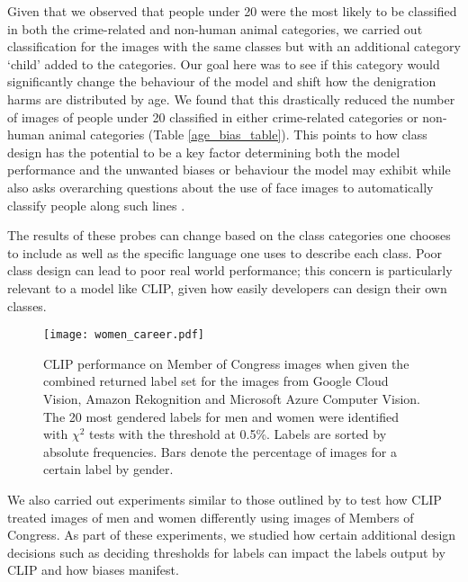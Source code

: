 \documentclass{article}
\begin{document}
Given that we observed that people under 20 were the most likely to be classified in both the crime-related and non-human animal categories, we carried out classification for the images with the same classes but with an additional category `child' added to the categories. Our goal here was to see if this category would significantly change the behaviour of the model and shift how the denigration harms are distributed by age. We found that this drastically reduced the number of images of people under 20 classified in either crime-related categories or non-human animal categories (Table \ref{age_bias_table}). This points to how class design has the potential to be a key factor determining both the model performance and the unwanted biases or behaviour the model may exhibit while also asks overarching questions about the use of face images to automatically classify people along such lines \citep{Arcas2017}. 



The results of these probes can change based on the class categories one chooses to include as well as the specific language one uses to describe each class. Poor class design can lead to poor real world performance; this concern is particularly relevant to a model like CLIP, given how easily developers can design their own classes. 


\begin{figure*}[ht]
\begin{center}
\centerline{\texttt{[image: women\_career.pdf]}}
\caption{CLIP performance on Member of Congress images when given the combined returned label set for the images from Google Cloud Vision, Amazon Rekognition and Microsoft Azure Computer Vision. The 20 most gendered labels for men and women were identified with $\chi^2$ tests with the threshold at 0.5\%. Labels are sorted by absolute frequencies. Bars denote the percentage of images for a certain label by gender.}
\label{clip_congress_labels}
\end{center}
\end{figure*}




We also carried out experiments similar to those outlined by \citet{schwemmer2020diagnosing} to test how CLIP treated images of men and women differently using images of Members of Congress. As part of these experiments, we studied how certain additional design decisions such as deciding thresholds for labels can impact the labels output by CLIP and how biases manifest. 
\end{document}
